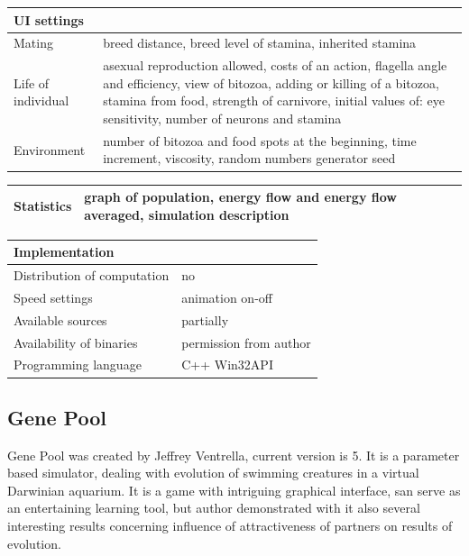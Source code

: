 \documentclass[a4paper,12pt]{report}
\begin{document}
\vspace{10pt}
\begin{tabular}{|p{150pt}|p{220pt}|}
\hline 	\textbf  {UI settings}&\\ \hline
Mating&breed distance, breed level of stamina, inherited stamina\\ \hline
Life of individual&asexual reproduction allowed, costs of an action, flagella angle and efficiency, view of bitozoa, adding or killing of a bitozoa, stamina from food, strength of carnivore, initial values of: eye sensitivity, number of neurons and stamina\\ \hline
Environment&number of bitozoa and food spots at the beginning, time increment, viscosity, random numbers generator seed\\ \hline
\end{tabular} 

\vspace{10pt}
\begin{tabular}{|p{150pt}|p{220pt}|}
\hline 	\textbf  {Statistics}&graph of population, energy flow and energy flow averaged, simulation description\\ \hline
\end{tabular} 

\vspace{10pt}
\begin{tabular}{|p{150pt}|p{220pt}|}\hline 	
\textbf  {Implementation}&\\ \hline
Distribution of computation&no\\ \hline
Speed settings&animation on-off\\ \hline
Available sources&partially\\ \hline
Availability of binaries&permission from author\\ \hline
Programming language&C++ Win32API\\ \hline
\end{tabular}

\subsection {Gene Pool}
Gene Pool was created by Jeffrey Ventrella, current version is 5. It is a parameter based simulator, dealing with evolution of swimming creatures in a virtual Darwinian aquarium. It is a game with intriguing graphical interface, san serve as an entertaining learning tool, but author demonstrated with it also several interesting results concerning influence of attractiveness of partners on  results of evolution.\cite{GenePool1} \cite{GenePool2}
\end{document}
